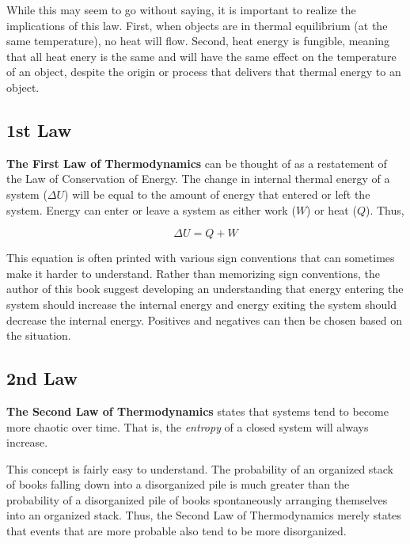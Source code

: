 	While this may seem to go without saying, it is important to realize the implications of this law.  First, when objects are in thermal equilibrium (at the same temperature), no heat will flow.  Second, heat energy is fungible, meaning that all heat enery is the same and will have the same effect on the temperature of an object, despite the origin or process that delivers that thermal energy to an object.
	
	\subsection{1st Law}
		
		\textbf{The First Law of Thermodynamics} can be thought of as a restatement of the Law of Conservation of Energy. The change in internal thermal energy of a system ($\Delta U$) will be equal to the amount of energy that entered or left the system.  Energy can enter or leave a system as either work ($W$) or heat ($Q$).  Thus,
		
		\begin{mdframed}[backgroundcolor=orange!20!white]
		\begin{equation}
				\Delta U = Q + W
				\label{eqn:firstlawofthermo}
		\end{equation}
		\end{mdframed}
			
This equation is often printed with various sign conventions that can sometimes make it harder to understand.  Rather than memorizing sign conventions, the author of this book suggest developing an understanding that energy entering the system should increase the internal energy and energy exiting the system should decrease the internal energy.  Positives and negatives can then be chosen based on the situation.  

	
	\subsection{2nd Law} 
			\textbf{The Second Law of Thermodynamics} states that systems tend to become more chaotic over time.  That is, the \textit{entropy} of a closed system will always increase.  
			
			This concept is fairly easy to understand.  The probability of an organized stack of books falling down into a disorganized pile is much greater than the probability of a disorganized pile of books spontaneously arranging themselves into an organized stack.  Thus, the Second Law of Thermodynamics merely states that events that are more probable also tend to be more disorganized.  
			
